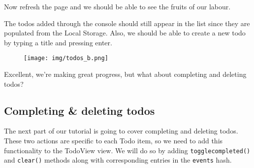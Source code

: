 \documentclass[9pt]{book}
\begin{document}
Now refresh the page and we should be able to see the fruits of our
labour.

The todos added through the console should still appear in the list
since they are populated from the Local Storage. Also, we should be able
to create a new todo by typing a title and pressing enter.

\begin{figure}[htbp]
\centering
\texttt{[image: img/todos\_b.png]}
\end{figure}

Excellent, we're making great progress, but what about completing and
deleting todos?

\subsection{Completing \& deleting
todos}\label{completing-deleting-todos}

The next part of our tutorial is going to cover completing and deleting
todos. These two actions are specific to each Todo item, so we need to
add this functionality to the TodoView view. We will do so by adding
\texttt{togglecompleted()} and \texttt{clear()} methods along with
corresponding entries in the \texttt{events} hash.
\end{document}
